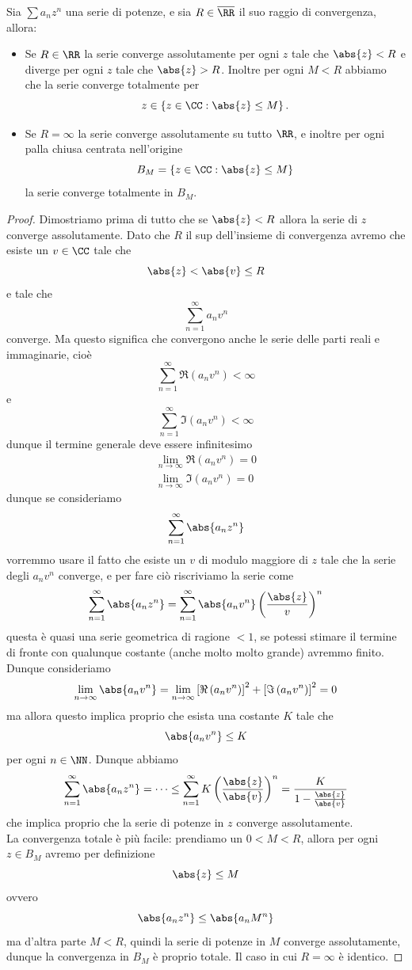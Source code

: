 \documentclass[11pt]{scrartcl}
\begin{document}
	\begin{theorem}
		Sia $\sum a_nz^n$ una serie di potenze, e sia $R\in\overline{\RR}$ il suo raggio di convergenza, allora:
		\begin{itemize}
			\item Se $R\in\RR$ la serie converge assolutamente per ogni $z$ tale che $\abs{z}<R$ e diverge per ogni $z$ tale che $\abs{z}>R$. Inoltre per ogni $M<R$ abbiamo che la serie converge totalmente per 
			$$z\in \left\{z\in \CC:\abs{z}\le M\right\}.$$
			\item Se $R=\infty$ la serie converge assolutamente su tutto $\RR$, e inoltre per ogni palla chiusa centrata nell'origine 
			$$B_M=\left\{z\in \CC: \abs{z}\le M\right\}$$
			la serie converge totalmente in $B_M$.
		\end{itemize}
	\end{theorem}
	\begin{proof}
		Dimostriamo prima di tutto che se $\abs{z}<R$ allora la serie di $z$ converge assolutamente. Dato che $R$ il sup dell'insieme di convergenza avremo che esiste un $v\in\CC$ tale che
		$$\abs{z}<\abs{v}\le R$$
		e tale che
		$$\sum_{n=1}^{\infty}a_nv^n$$
		converge. Ma questo significa che convergono anche le serie delle parti reali e immaginarie, cioè
		$$\sum_{n=1}^{\infty}\Re\left(a_n v^n\right)<\infty$$
		e
		$$\sum_{n=1}^{\infty}\Im\left(a_n v^n\right)<\infty$$
		dunque il termine generale deve essere infinitesimo
		\begin{gather*}
			\lim_{n\to\infty}\Re\left(a_n v^n\right)=0 \\
			\lim_{n\to\infty}\Im\left(a_n v^n\right)=0
		\end{gather*}
		dunque se consideriamo
		$$\sum_{n=1}^{\infty}\abs{a_nz^n}$$
		vorremmo usare il fatto che esiste un $v$ di modulo maggiore di $z$ tale che la serie degli $a_nv^n$ converge, e per fare ciò riscriviamo la serie come
		$$\sum_{n=1}^{\infty}\abs{a_nz^n}=\sum_{n=1}^{\infty}\abs{a_nv^n}\left(\frac{\abs{z}}{v}\right)^n$$
		questa è quasi una serie geometrica di ragione $<1$, se potessi stimare il termine di fronte con qualunque costante (anche molto molto grande) avremmo finito. Dunque consideriamo
		$$\lim_{n\to\infty}\abs{a_nv^n}=\lim_{n\to\infty}\left[\Re\left(a_n v^n\right)\right]^2+\left[\Im\left(a_n v^n\right)\right]^2=0$$
		ma allora questo implica proprio che esista una costante $K$ tale che
		$$\abs{a_nv^n}\le K$$
		per ogni $n\in\NN$. Dunque abbiamo 
		$$\sum_{n=1}^{\infty}\abs{a_nz^n}=\dots\le \sum_{n=1}^{\infty}K\left(\frac{\abs{z}}{\abs{v}}\right)^n=\frac{K}{1-\frac{\abs{z}}{\abs{v}}}$$
		che implica proprio che la serie di potenze in $z$ converge assolutamente. \\
		La convergenza totale è più facile: prendiamo un $0<M<R$, allora per ogni $z\in B_M$ avremo per definizione 
		$$\abs{z}\le M$$
		ovvero
		$$\abs{a_nz^n}\le \abs{a_nM^n}$$
		ma d'altra parte $M<R$, quindi la serie di potenze in $M$ converge assolutamente, dunque la convergenza in $B_M$ è proprio totale. Il caso in cui $R=\infty$ è identico.
	\end{proof}
\end{document}
